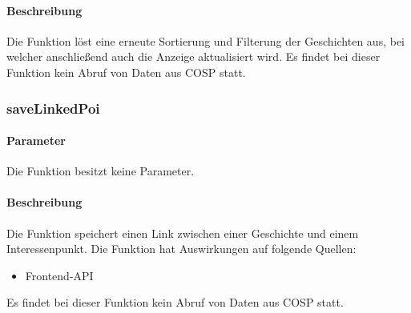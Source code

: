 \paragraph{Beschreibung} Die Funktion löst eine erneute Sortierung und Filterung der Geschichten aus, bei welcher anschließend auch die Anzeige aktualisiert wird. Es findet bei dieser Funktion kein Abruf von Daten aus {\glqq COSP\grqq} statt.
\subsubsection{saveLinkedPoi}
\paragraph{Parameter} Die Funktion besitzt keine Parameter.
\paragraph{Beschreibung} Die Funktion speichert einen Link zwischen einer Geschichte und einem Interessenpunkt. Die Funktion hat Auswirkungen auf folgende Quellen:
\begin{itemize}
	\item Frontend-API
\end{itemize}
Es findet bei dieser Funktion kein Abruf von Daten aus {\glqq COSP\grqq} statt.